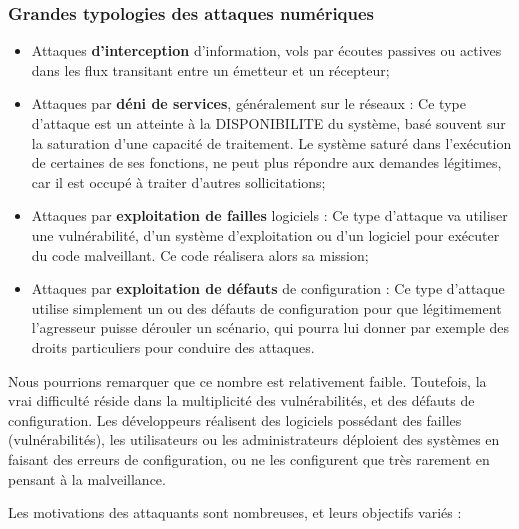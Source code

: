 \begin{frame}
\frametitle<presentation>{Grandes typologies des attaques numériques}
\begin{itemize}
\item Attaques \textbf{d’interception} d’information, vols par écoutes passives ou actives dans les flux transitant entre un émetteur et un récepteur;
\item Attaques par \textbf{déni de services}, généralement sur le réseaux : Ce type d’attaque est un atteinte à la DISPONIBILITE du système, basé souvent sur la saturation d’une capacité de traitement. Le système saturé dans l’exécution de certaines de ses fonctions, ne peut plus répondre aux demandes légitimes, car il est occupé à traiter d’autres sollicitations;
\item Attaques par \textbf{exploitation de failles }logiciels : Ce type d’attaque va utiliser une vulnérabilité, d’un système d’exploitation ou d’un logiciel pour exécuter du code malveillant. Ce code réalisera alors sa mission;
\item Attaques par \textbf{exploitation de défauts} de configuration : Ce type d’attaque utilise simplement un ou des défauts de configuration pour que légitimement l’agresseur puisse dérouler un scénario, qui pourra lui donner par exemple des droits particuliers pour conduire des attaques.
\end{itemize}
\end{frame}

Nous pourrions remarquer que ce nombre est relativement faible. Toutefois, la vrai difficulté réside dans la multiplicité des vulnérabilités, et des défauts de configuration. Les développeurs réalisent des logiciels possédant des failles (vulnérabilités), les utilisateurs ou les administrateurs déploient des systèmes en faisant des erreurs de configuration, ou ne les configurent que très rarement en pensant à la malveillance.

Les motivations des attaquants sont nombreuses, et leurs objectifs variés :

